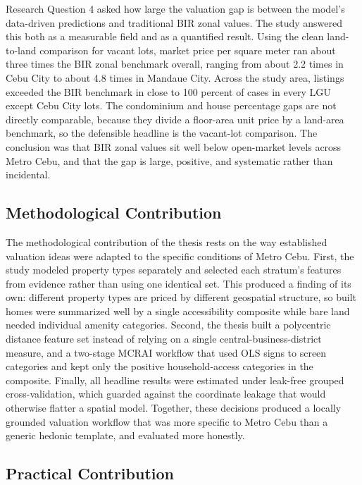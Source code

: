 Research Question 4 asked how large the valuation gap is between the model's data-driven predictions and traditional BIR zonal values. The study answered this both as a measurable field and as a quantified result. Using the clean land-to-land comparison for vacant lots, market price per square meter ran about three times the BIR zonal benchmark overall, ranging from about 2.2 times in Cebu City to about 4.8 times in Mandaue City. Across the study area, listings exceeded the BIR benchmark in close to 100 percent of cases in every LGU except Cebu City lots. The condominium and house percentage gaps are not directly comparable, because they divide a floor-area unit price by a land-area benchmark, so the defensible headline is the vacant-lot comparison. The conclusion was that BIR zonal values sit well below open-market levels across Metro Cebu, and that the gap is large, positive, and systematic rather than incidental.

\subsection{Methodological Contribution}\label{methodological-contribution}

The methodological contribution of the thesis rests on the way established valuation ideas were adapted to the specific conditions of Metro Cebu. First, the study modeled property types separately and selected each stratum's features from evidence rather than using one identical set. This produced a finding of its own: different property types are priced by different geospatial structure, so built homes were summarized well by a single accessibility composite while bare land needed individual amenity categories. Second, the thesis built a polycentric distance feature set instead of relying on a single central-business-district measure, and a two-stage MCRAI workflow that used OLS signs to screen categories and kept only the positive household-access categories in the composite. Finally, all headline results were estimated under leak-free grouped cross-validation, which guarded against the coordinate leakage that would otherwise flatter a spatial model. Together, these decisions produced a locally grounded valuation workflow that was more specific to Metro Cebu than a generic hedonic template, and evaluated more honestly.

\subsection{Practical Contribution}\label{practical-contribution}

